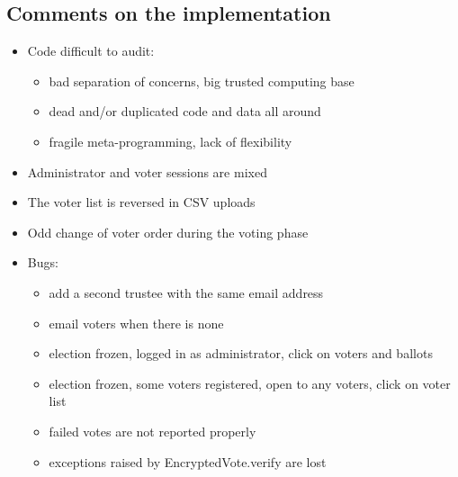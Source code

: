 \documentclass[a4paper]{article}
\begin{document}
\subsection{Comments on the implementation}
\begin{itemize}
\item Code difficult to audit:
  \begin{itemize}
  \item bad separation of concerns, big trusted computing base
  \item dead and/or duplicated code and data all around
  \item fragile meta-programming, lack of flexibility
  \end{itemize}
\item Administrator and voter sessions are mixed
\item The voter list is reversed in CSV uploads
\item Odd change of voter order during the voting phase
\item Bugs:
  \begin{itemize}
  \item add a second trustee with the same email address
  \item email voters when there is none
  \item election frozen, logged in as administrator, click on voters and ballots
  \item election frozen, some voters registered, open to any voters, click on voter list
  \item failed votes are not reported properly
  \item exceptions raised by EncryptedVote.verify are lost
  \end{itemize}
\end{itemize}
\end{document}
